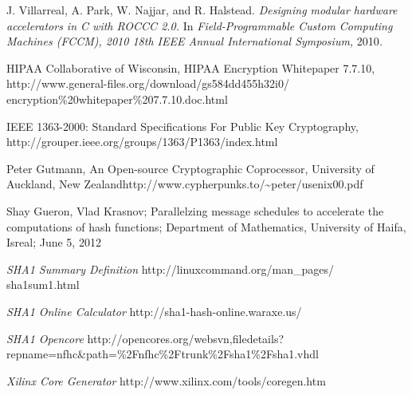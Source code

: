 \documentclass[journal]{IEEEtran}
\begin{document}
\begin{thebibliography}{1}
J. Villarreal, A. Park, W. Najjar, and R. Halstead.
\emph{Designing modular hardware accelerators in C with ROCCC 2.0.}
In\emph{ Field-Programmable Custom Computing Machines (FCCM), 2010
18th IEEE Annual International Symposium, }2010\emph{.}

HIPAA Collaborative of Wisconsin, HIPAA Encryption
Whitepaper 7.7.10, http://www.general-files.org/download/gs584dd455h32i0/ encryption\%20whitepaper\%207.7.10.doc.html

IEEE 1363-2000: Standard Specifications For Public
Key Cryptography, http://grouper.ieee.org/groups/1363/P1363/index.html

Peter Gutmann, An Open-source Cryptographic Coprocessor,
University of Auckland, New Zealandhttp://www.cypherpunks.to/\textasciitilde{}peter/usenix00.pdf

Shay Gueron, Vlad Krasnov; Parallelzing message schedules
to accelerate the computations of hash functions; Department of Mathematics,
University of Haifa, Isreal; June 5, 2012

 \emph{SHA1 Summary Definition}
 http://linuxcommand.org/man\_pages/ sha1sum1.html
 
 \emph{SHA1 Online Calculator}
 http://sha1-hash-online.waraxe.us/ 
 
 \emph{SHA1 Opencore}
 http://opencores.org/websvn,filedetails? repname=nfhc\&path=\%2Fnfhc\%2Ftrunk\%2Fsha1\%2Fsha1.vhdl

\emph{Xilinx Core Generator}
 http://www.xilinx.com/tools/coregen.htm

\end{thebibliography}
\end{document}
